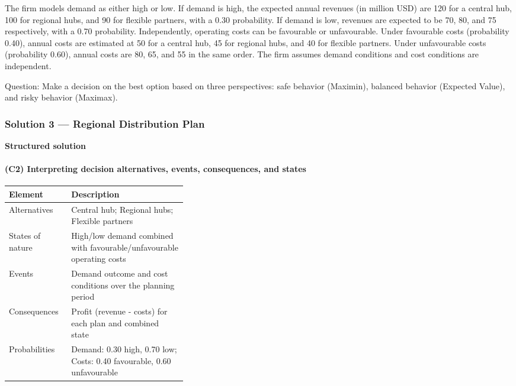 The firm models demand as either high or low. If demand is high, the expected annual revenues (in million USD) are 120 for
a central hub, 100 for regional hubs, and 90 for flexible partners, with a 0.30 probability. If demand is low, revenues are
expected to be 70, 80, and 75 respectively, with a 0.70 probability. Independently, operating costs can be favourable or
unfavourable. Under favourable costs (probability 0.40), annual costs are estimated at 50 for a central hub, 45 for regional
hubs, and 40 for flexible partners. Under unfavourable costs (probability 0.60), annual costs are 80, 65, and 55 in the same
order. The firm assumes demand conditions and cost conditions are independent.

Question: Make a decision on the best option based on three perspectives: safe behavior (Maximin), balanced behavior (Expected Value), and risky behavior (Maximax).

\subsubsection{Solution 3 --- Regional Distribution Plan}\label{subsec:practice-activity-2-solution-3}

\textbf{Structured solution}

\paragraph{(C2) Interpreting decision alternatives, events, consequences, and states}\label{subsubsec:practice-activity-2-solution-3-c2}

\begin{center}
	\begin{tabularx}{\linewidth}{@{}L{0.35\linewidth}Y@{}}
		\toprule
		Element & Description \\
		\midrule
		Alternatives & Central hub; Regional hubs; Flexible partners \\
		States of nature & High/low demand combined with favourable/unfavourable operating costs \\
		Events & Demand outcome and cost conditions over the planning period \\
		Consequences & Profit (revenue - costs) for each plan and combined state \\
		Probabilities & Demand: 0.30 high, 0.70 low; Costs: 0.40 favourable, 0.60 unfavourable \\
		\bottomrule
	\end{tabularx}
\end{center}

